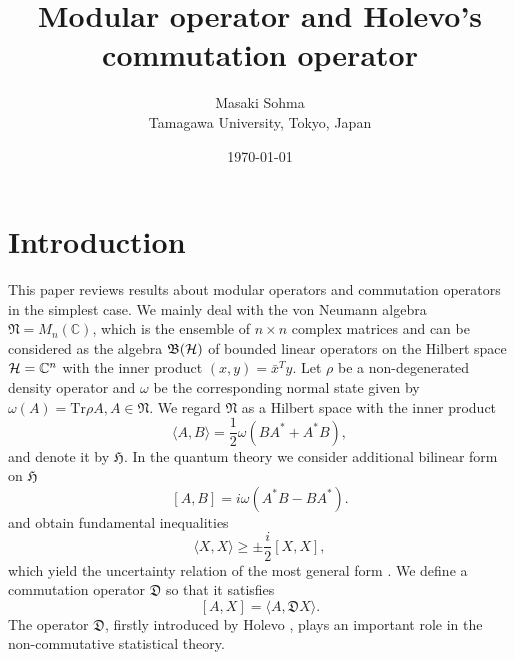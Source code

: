 \documentclass{article}
\begin{document}
\title{Modular operator and Holevo's commutation operator}


 \author{Masaki Sohma
\\
Tamagawa University, Tokyo, Japan}


\date{\today}



\maketitle




\section{Introduction}
This paper reviews results about  modular operators \cite{Longo_1978} and  commutation operators \cite{Holevo_1977} in the simplest case.
We mainly deal with the von Neumann algebra $\mathfrak{N}=M_n(\mathbb{C})$, 
which is the ensemble of $n\times n$ complex matrices and can be considered as the algebra $\mathfrak{B}({\cal H})$ of bounded linear operators on 
the Hilbert space ${\cal H}=\mathbb{C}^{n}$ with the inner product $(x,y)=\bar{x}^Ty$. 
Let $\rho$ be a non-degenerated density operator and 
$\omega$ be the corresponding normal state given by $\omega(A)=\mbox{Tr}\rho A, A\in \mathfrak{N}$.
We regard $\mathfrak{N}$ as a Hilbert space with the inner product
\begin{equation}
\label{innerP}
\langle A, B \rangle =\frac{1}{2}\omega(BA^{\ast}+A^{\ast}B),
\end{equation}
and denote it by $\mathfrak{H}$.
In the quantum theory we consider additional bilinear form on $\mathfrak{H}$ 
\begin{equation}\label{Bform}
[A,B]=i\omega(A^{\ast}B-BA^{\ast}).
\end{equation}
and  obtain fundamental inequalities 
$$
\langle X, X\rangle \geq \pm \frac{i}{2}[X,X],
$$
which yield  the uncertainty relation of the most general form \cite{Holevo_1977}.
We define a commutation operator $\mathfrak{D}$ so that it satisfies 
\begin{equation}\label{Copr}
[A,X]=\langle A, \mathfrak{D}X\rangle.
\end{equation}
The operator $\mathfrak{D}$, firstly introduced by Holevo \cite{Holevo_1977}, plays an important role in the non-commutative statistical theory.  
\end{document}
